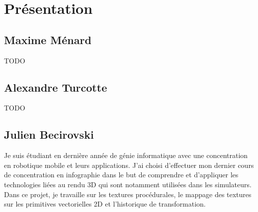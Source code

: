 \section{Présentation}
\label{s:présentation}

\subsection{Maxime Ménard}
TODO
\subsection{Alexandre Turcotte}
TODO
\subsection{Julien Becirovski}
Je suis étudiant en dernière année de génie informatique avec une concentration en robotique mobile et leurs applications. J'ai choisi d'effectuer mon dernier cours de concentration en infographie dans le but de comprendre et d'appliquer les technologies liées au rendu 3D qui sont notamment utilisées dans les simulateurs. Dans ce projet, je travaille sur les textures procédurales, le mappage des textures sur les primitives vectorielles 2D et l'historique de transformation. 